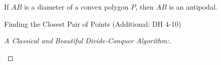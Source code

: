 \begin{frame}{}
  \begin{theorem}
    If $AB$ is a diameter of a convex polygon $P$, then $AB$ is an antipodal.
  \end{theorem}

  \vspace{0.30cm}
  \pause
  \begin{center}
    
  \end{center}

  \vspace{0.30cm}
\end{frame}

\begin{frame}{}
  \begin{exampleblock}{Finding the Closest Pair of Points (Additional: DH 4-10)}
  \end{exampleblock}

  \pause
  \begin{proof}[A Classical and Beautiful Divide-Conquer Algorithm:]
    \vspace{-0.60cm}
    \begin{center}
      {}
    \end{center}
  \end{proof}
\end{frame}

